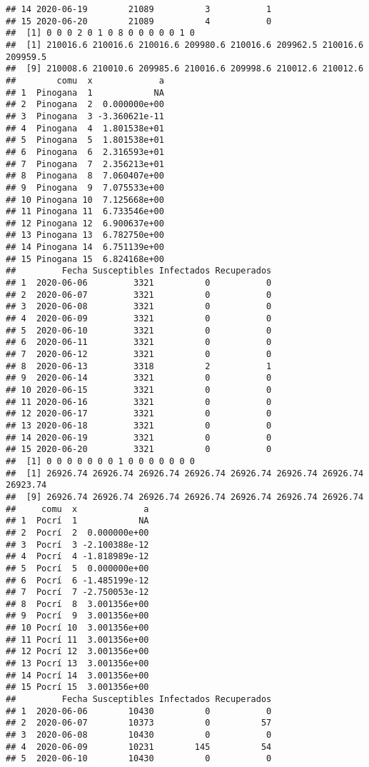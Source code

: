 \documentclass[
]{article}
\begin{document}
\begin{verbatim}
## 14 2020-06-19        21089          3           1
## 15 2020-06-20        21089          4           0
##  [1] 0 0 0 2 0 1 0 8 0 0 0 0 0 1 0
##  [1] 210016.6 210016.6 210016.6 209980.6 210016.6 209962.5 210016.6 209959.5
##  [9] 210008.6 210010.6 209985.6 210016.6 209998.6 210012.6 210012.6
##        comu  x             a
## 1  Pinogana  1            NA
## 2  Pinogana  2  0.000000e+00
## 3  Pinogana  3 -3.360621e-11
## 4  Pinogana  4  1.801538e+01
## 5  Pinogana  5  1.801538e+01
## 6  Pinogana  6  2.316593e+01
## 7  Pinogana  7  2.356213e+01
## 8  Pinogana  8  7.060407e+00
## 9  Pinogana  9  7.075533e+00
## 10 Pinogana 10  7.125668e+00
## 11 Pinogana 11  6.733546e+00
## 12 Pinogana 12  6.900637e+00
## 13 Pinogana 13  6.782750e+00
## 14 Pinogana 14  6.751139e+00
## 15 Pinogana 15  6.824168e+00
##         Fecha Susceptibles Infectados Recuperados
## 1  2020-06-06         3321          0           0
## 2  2020-06-07         3321          0           0
## 3  2020-06-08         3321          0           0
## 4  2020-06-09         3321          0           0
## 5  2020-06-10         3321          0           0
## 6  2020-06-11         3321          0           0
## 7  2020-06-12         3321          0           0
## 8  2020-06-13         3318          2           1
## 9  2020-06-14         3321          0           0
## 10 2020-06-15         3321          0           0
## 11 2020-06-16         3321          0           0
## 12 2020-06-17         3321          0           0
## 13 2020-06-18         3321          0           0
## 14 2020-06-19         3321          0           0
## 15 2020-06-20         3321          0           0
##  [1] 0 0 0 0 0 0 0 1 0 0 0 0 0 0 0
##  [1] 26926.74 26926.74 26926.74 26926.74 26926.74 26926.74 26926.74 26923.74
##  [9] 26926.74 26926.74 26926.74 26926.74 26926.74 26926.74 26926.74
##     comu  x             a
## 1  Pocrí  1            NA
## 2  Pocrí  2  0.000000e+00
## 3  Pocrí  3 -2.100388e-12
## 4  Pocrí  4 -1.818989e-12
## 5  Pocrí  5  0.000000e+00
## 6  Pocrí  6 -1.485199e-12
## 7  Pocrí  7 -2.750053e-12
## 8  Pocrí  8  3.001356e+00
## 9  Pocrí  9  3.001356e+00
## 10 Pocrí 10  3.001356e+00
## 11 Pocrí 11  3.001356e+00
## 12 Pocrí 12  3.001356e+00
## 13 Pocrí 13  3.001356e+00
## 14 Pocrí 14  3.001356e+00
## 15 Pocrí 15  3.001356e+00
##         Fecha Susceptibles Infectados Recuperados
## 1  2020-06-06        10430          0           0
## 2  2020-06-07        10373          0          57
## 3  2020-06-08        10430          0           0
## 4  2020-06-09        10231        145          54
## 5  2020-06-10        10430          0           0

\end{verbatim}
\end{document}
